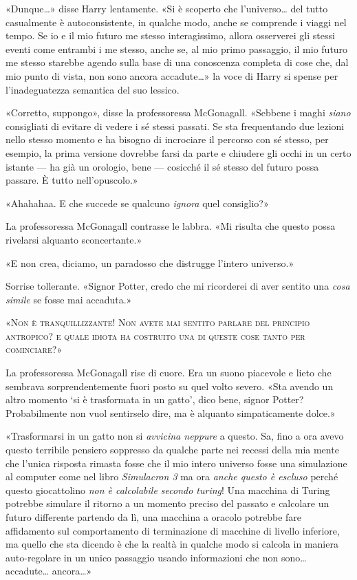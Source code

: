 «Dunque…» disse Harry lentamente. «Si è scoperto che l’universo… del tutto casualmente è autoconsistente, in qualche modo, anche se comprende i viaggi nel tempo. Se io e il mio futuro me stesso interagissimo, allora osserverei gli stessi eventi come entrambi i me stesso, anche se, al mio primo passaggio, il mio futuro me stesso starebbe agendo sulla base di una conoscenza completa di cose che, dal mio punto di vista, non sono ancora accadute…» la voce di Harry si spense per l’inadeguatezza semantica del suo lessico.

«Corretto, suppongo», disse la professoressa McGonagall. «Sebbene i maghi \textit{siano} consigliati di evitare di vedere i sé stessi passati. Se sta frequentando due lezioni nello stesso momento e ha bisogno di incrociare il percorso con sé stesso, per esempio, la prima versione dovrebbe farsi da parte e chiudere gli occhi in un certo istante — ha già un orologio, bene — cosicché il sé stesso del futuro possa passare. È tutto nell’opuscolo.»

«Ahahahaa. E che succede se qualcuno \textit{ignora} quel consiglio?»

La professoressa McGonagall contrasse le labbra. «Mi risulta che questo possa rivelarsi alquanto sconcertante.»

«E non crea, diciamo, un paradosso che distrugge l’intero universo.»

Sorrise tollerante. «Signor Potter, credo che mi ricorderei di aver sentito una \textit{cosa simile} se fosse mai accaduta.»

«\textsc{Non è tranquillizzante! Non avete mai sentito parlare del principio antropico? e quale idiota ha costruito una di queste cose tanto per cominciare?}»

La professoressa McGonagall rise di cuore. Era un suono piacevole e lieto che sembrava sorprendentemente fuori posto su quel volto severo. «Sta avendo un altro momento ‘si è trasformata in un gatto’, dico bene, signor Potter? Probabilmente non vuol sentirselo dire, ma è alquanto simpaticamente dolce.»

«Trasformarsi in un gatto non si \textit{avvicina neppure} a questo. Sa, fino a ora avevo questo terribile pensiero soppresso da qualche parte nei recessi della mia mente che l’unica risposta rimasta fosse che il mio intero universo fosse una simulazione al computer come nel libro \textit{Simulacron 3} ma ora \textit{anche questo è escluso} perché questo giocattolino \textit{non è calcolabile secondo turing}! Una macchina di Turing potrebbe simulare il ritorno a un momento preciso del passato e calcolare un futuro differente partendo da lì, una macchina a oracolo potrebbe fare affidamento sul comportamento di terminazione di macchine di livello inferiore, ma quello che sta dicendo è che la realtà in qualche modo si calcola in maniera auto-regolare in un unico passaggio usando informazioni che non sono… accadute… ancora…»

